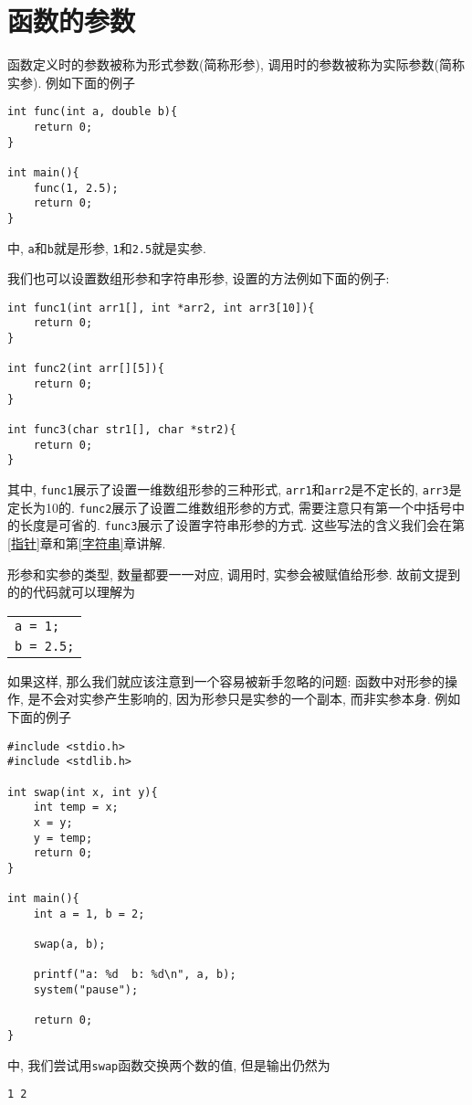     \section{函数的参数}
        函数定义时的参数被称为形式参数(简称形参), 调用时的参数被称为实际参数(简称实参). 例如下面的例子
\begin{lstlisting}
int func(int a, double b){
    return 0;
}

int main(){
    func(1, 2.5);
    return 0;
}
\end{lstlisting}
        中, \texttt{a}和\texttt{b}就是形参, \texttt{1}和\texttt{2.5}就是实参.

        我们也可以设置数组形参和字符串形参, 设置的方法例如下面的例子:
\begin{lstlisting}
int func1(int arr1[], int *arr2, int arr3[10]){
    return 0;
}

int func2(int arr[][5]){
    return 0;
}

int func3(char str1[], char *str2){
    return 0;
}
\end{lstlisting}

        其中, \texttt{func1}展示了设置一维数组形参的三种形式, \texttt{arr1}和\texttt{arr2}是不定长的, \texttt{arr3}是定长为10的. \texttt{func2}展示了设置二维数组形参的方式, 需要注意只有第一个中括号中的长度是可省的. \texttt{func3}展示了设置字符串形参的方式. 这些写法的含义我们会在第\ref{指针}章和第\ref{字符串}章讲解.

        形参和实参的类型, 数量都要一一对应, 调用时, 实参会被赋值给形参. 故前文提到的的代码就可以理解为
        \begin{center}
        \begin{longtable}{l}
            \texttt{a = 1;} \\
            \texttt{b = 2.5;}
        \end{longtable}
        \end{center}

        如果这样, 那么我们就应该注意到一个容易被新手忽略的问题: 函数中对形参的操作, 是不会对实参产生影响的, 因为形参只是实参的一个副本, 而非实参本身. 例如下面的例子
\begin{lstlisting}
#include <stdio.h>
#include <stdlib.h>

int swap(int x, int y){
    int temp = x;
    x = y;
    y = temp;
    return 0;
}

int main(){
    int a = 1, b = 2;

    swap(a, b);
    
    printf("a: %d  b: %d\n", a, b);
    system("pause");

    return 0;
}
\end{lstlisting}
        中, 我们尝试用\texttt{swap}函数交换两个数的值, 但是输出仍然为
\begin{lstlisting}
1 2
\end{lstlisting}

